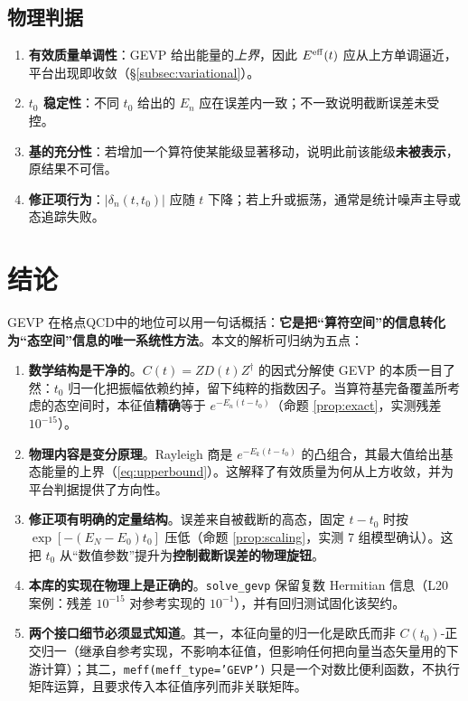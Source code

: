 \documentclass[12pt,a4paper]{ctexart}
\theoremstyle{definition}
\newcommand{\dagg}{\dagger}
\newcommand{\code}[1]{\texttt{#1}}
\begin{document}
\subsection{物理判据}

\begin{enumerate}[nosep]
    \item \textbf{有效质量单调性}：GEVP 给出能量的\emph{上界}，因此 $E^{\rm eff}(t)$ 应从上方单调逼近，平台出现即收敛（§\ref{subsec:variational}）。
    \item \textbf{$t_0$ 稳定性}：不同 $t_0$ 给出的 $E_n$ 应在误差内一致；不一致说明截断误差未受控。
    \item \textbf{基的充分性}：若增加一个算符使某能级显著移动，说明此前该能级\textbf{未被表示}，原结果不可信。
    \item \textbf{修正项行为}：$|\delta_n(t,t_0)|$ 应随 $t$ 下降；若上升或振荡，通常是统计噪声主导或态追踪失败。
\end{enumerate}

\section{结论}\label{sec:conclusion}

GEVP 在格点QCD中的地位可以用一句话概括：\textbf{它是把``算符空间''的信息转化为``态空间''信息的唯一系统性方法}。本文的解析可归纳为五点：

\begin{enumerate}
    \item \textbf{数学结构是干净的}。$C(t) = ZD(t)Z^\dagg$ 的因式分解使 GEVP 的本质一目了然：$t_0$ 归一化把振幅依赖约掉，留下纯粹的指数因子。当算符基完备覆盖所考虑的态空间时，本征值\textbf{精确}等于 $e^{-E_n(t-t_0)}$（命题 \ref{prop:exact}，实测残差 $10^{-15}$）。

    \item \textbf{物理内容是变分原理}。Rayleigh 商是 $e^{-E_k(t-t_0)}$ 的凸组合，其最大值给出基态能量的上界（\eqref{eq:upperbound}）。这解释了有效质量为何从上方收敛，并为平台判据提供了方向性。

    \item \textbf{修正项有明确的定量结构}。误差来自被截断的高态，固定 $t-t_0$ 时按 $\exp[-(E_N-E_0)t_0]$ 压低（命题 \ref{prop:scaling}，实测 7 组模型确认）。这把 $t_0$ 从``数值参数''提升为\textbf{控制截断误差的物理旋钮}。

    \item \textbf{本库的实现在物理上是正确的}。\code{solve\_gevp} 保留复数 Hermitian 信息（L20 案例：残差 $10^{-15}$ 对参考实现的 $10^{-1}$），并有回归测试固化该契约。

    \item \textbf{两个接口细节必须显式知道}。其一，本征向量的归一化是欧氏而非 $C(t_0)$-正交归一（继承自参考实现，不影响本征值，但影响任何把向量当态矢量用的下游计算）；其二，\code{meff(meff\_type='GEVP')} 只是一个对数比便利函数，不执行矩阵运算，且要求传入本征值序列而非关联矩阵。
\end{enumerate}
\end{document}
